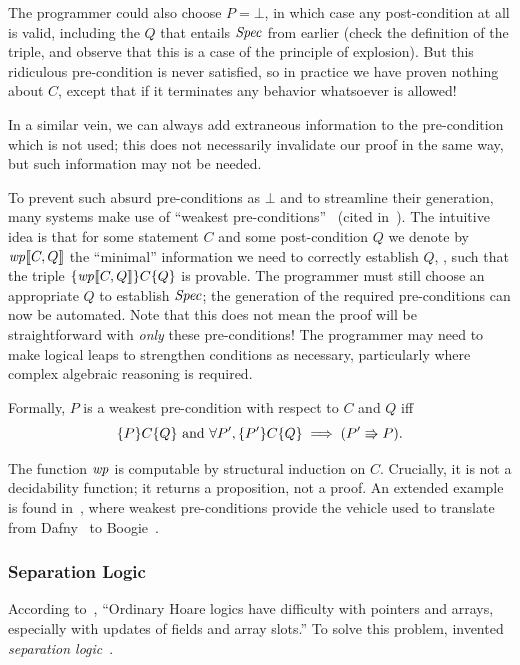 The programmer could also choose \(P = \bot\), in which case any post-condition
at all is valid, including the \(Q\) that entails \(\mathit{Spec}\) from earlier
(check the definition of the triple, and observe that this is a case of the
principle of explosion). But this ridiculous pre-condition is never satisfied,
so in practice we have proven nothing about \(C\), except that if it terminates
any behavior whatsoever is allowed!

In a similar vein, we can always add extraneous information to the pre-condition
which is not used; this does not necessarily invalidate our proof in the same
way, but such information may not be needed.

To prevent such absurd pre-conditions as \(\bot\) and to streamline their
generation, many systems make use of ``weakest
pre-conditions''~\cite{dijkstra1976discipline,Nelson_1989} (cited
in~\cite{leino2008specification}). The intuitive idea is that for some statement
\(C\) and some post-condition \(Q\) we denote by \(\mathit{wp}\llbracket C, Q\rrbracket\) the ``minimal''
information we need to correctly establish \(Q\), \ie, such that the triple
\(\{\mathit{wp}\llbracket C,Q\rrbracket\} C \{Q\}\) is provable. The programmer must still choose an
appropriate \(Q\) to establish \(\mathit{Spec}\); the generation of the required
pre-conditions can now be automated. Note that this does not mean the proof will
be straightforward with \emph{only} these pre-conditions! The programmer may
need to make logical leaps to strengthen conditions as necessary, particularly
where complex algebraic reasoning is required.

Formally, \(P\) is a weakest pre-condition with respect to \(C\) and \(Q\) iff
\begin{equation*}
    \{P\} C \{Q\} \text{ and } \forall P', \{P'\} C \{Q\} \implies (P' \mathrel{\Rrightarrow} P).
\end{equation*}

The function \(\mathit{wp}\) is computable by structural induction on
\(C\). Crucially, it is not a decidability function; it returns a proposition,
not a proof. An extended example is found in~\cite[\S 3]{leino2008specification},
where weakest pre-conditions provide the vehicle used to translate from
Dafny~\cite{leino2010dafny} to Boogie~\cite{Barnett_2006,leino2008this}.

\subsubsection{Separation Logic}

According to~\cite[\S 5]{Appel_2011}, ``Ordinary Hoare logics have difficulty
with pointers and arrays, especially with updates of fields and array slots.''
To solve this problem, \citeauthor{Reynolds} invented \emph{separation
logic}~\cite{Reynolds}.

